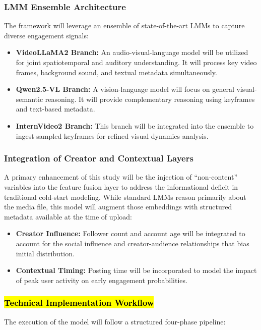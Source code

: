 \subsubsection{LMM Ensemble Architecture}
The framework will leverage an ensemble of state-of-the-art LMMs to capture diverse engagement signals:
\begin{itemize}
    \item \textbf{VideoLLaMA2 Branch:} An audio-visual-language model will be utilized for joint spatiotemporal and auditory understanding. It will process key video frames, background sound, and textual metadata simultaneously.
    \item \textbf{Qwen2.5-VL Branch:} A vision-language model will focus on general visual-semantic reasoning. It will provide complementary reasoning using keyframes and text-based metadata.
    \item \textbf{InternVideo2 Branch:} This branch will be integrated into the ensemble to ingest sampled keyframes for refined visual dynamics analysis.
\end{itemize}

\subsubsection{Integration of Creator and Contextual Layers}
A primary enhancement of this study will be the injection of ``non-content'' variables into the feature fusion layer to address the informational deficit in traditional cold-start modeling. While standard LMMs reason primarily about the media file, this model will augment those embeddings with structured metadata available at the time of upload:
\begin{itemize}
    \item \textbf{Creator Influence:} Follower count and account age will be integrated to account for the social influence and creator-audience relationships that bias initial distribution.
    \item \textbf{Contextual Timing:} Posting time will be incorporated to model the impact of peak user activity on early engagement probabilities.
\end{itemize}

\subsubsection{\hl{Technical Implementation Workflow}}
The execution of the model will follow a structured four-phase pipeline:

